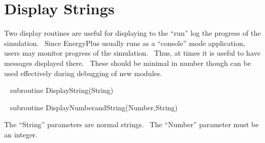 \section{Display Strings}\label{display-strings}

Two display routines are useful for displaying to the ``run'' log the progress of the simulation.~ Since EnergyPlus usually runs as a ``console'' mode application, users may monitor progress of the simulation.~ Thus, at times it is useful to have messages displayed there.~ These should be minimal in number though can be used effectively during debugging of new modules.

~ subroutine DisplayString(String)

~ subroutine DisplayNumberandString(Number,String)

The ``String'' parameters are normal strings.~ The ``Number'' parameter must be an integer.
